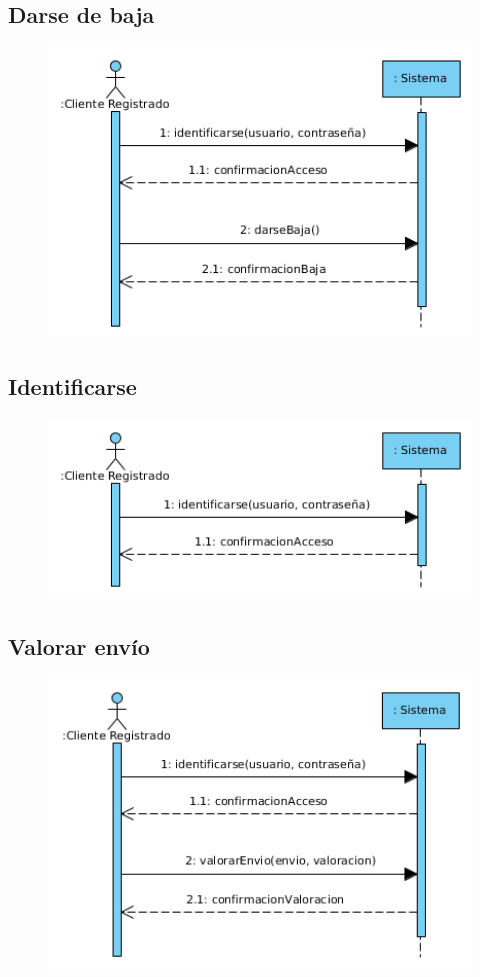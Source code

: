 \subsection{Darse de baja}
\begin{figure}[H]
	\centering
	\includegraphics[width=16cm]{60}
\end{figure}
\subsection{Identificarse}
\begin{figure}[H]
	\centering
	\includegraphics[width=16cm]{61}
\end{figure}
\subsection{Valorar envío}
\begin{figure}[H]
	\centering
	\includegraphics[width=16cm]{62}
\end{figure}
